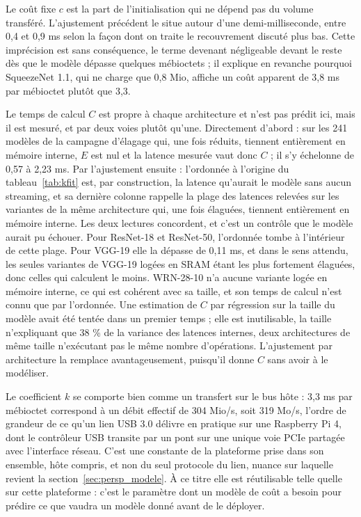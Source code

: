\documentclass[11pt,a4paper]{report}
\begin{document}
Le coût fixe $c$ est la part de l'initialisation qui ne dépend pas du volume transféré. L'ajustement précédent le situe autour d'une demi-milliseconde, entre 0,4 et 0,9 ms selon la façon dont on traite le recouvrement discuté plus bas. Cette imprécision est sans conséquence, le terme devenant négligeable devant le reste dès que le modèle dépasse quelques mébioctets ; il explique en revanche pourquoi SqueezeNet 1.1, qui ne charge que 0,8 Mio, affiche un coût apparent de 3,8 ms par mébioctet plutôt que 3,3.

Le temps de calcul $C$ est propre à chaque architecture et n'est pas prédit ici, mais il est mesuré, et par deux voies plutôt qu'une. Directement d'abord : sur les 241 modèles de la campagne d'élagage qui, une fois réduits, tiennent entièrement en mémoire interne, $E$ est nul et la latence mesurée vaut donc $C$ ; il s'y échelonne de 0,57 à 2,23 ms. Par l'ajustement ensuite : l'ordonnée à l'origine du tableau~\ref{tab:kfit} est, par construction, la latence qu'aurait le modèle sans aucun streaming, et sa dernière colonne rappelle la plage des latences relevées sur les variantes de la même architecture qui, une fois élaguées, tiennent entièrement en mémoire interne. Les deux lectures concordent, et c'est un contrôle que le modèle aurait pu échouer. Pour ResNet-18 et ResNet-50, l'ordonnée tombe à l'intérieur de cette plage. Pour VGG-19 elle la dépasse de 0,11 ms, et dans le sens attendu, les seules variantes de VGG-19 logées en SRAM étant les plus fortement élaguées, donc celles qui calculent le moins. WRN-28-10 n'a aucune variante logée en mémoire interne, ce qui est cohérent avec sa taille, et son temps de calcul n'est connu que par l'ordonnée. Une estimation de $C$ par régression sur la taille du modèle avait été tentée dans un premier temps ; elle est inutilisable, la taille n'expliquant que 38 \% de la variance des latences internes, deux architectures de même taille n'exécutant pas le même nombre d'opérations. L'ajustement par architecture la remplace avantageusement, puisqu'il donne $C$ sans avoir à le modéliser.

Le coefficient $k$ se comporte bien comme un transfert sur le bus hôte : 3,3 ms par mébioctet correspond à un débit effectif de 304 Mio/s, soit 319 Mo/s, l'ordre de grandeur de ce qu'un lien USB 3.0 délivre en pratique sur une Raspberry Pi 4, dont le contrôleur USB transite par un pont sur une unique voie PCIe partagée avec l'interface réseau. C'est une constante de la plateforme prise dans son ensemble, hôte compris, et non du seul protocole du lien, nuance sur laquelle revient la section~\ref{sec:persp_modele}. À ce titre elle est réutilisable telle quelle sur cette plateforme : c'est le paramètre dont un modèle de coût a besoin pour prédire ce que vaudra un modèle donné avant de le déployer.
\end{document}
